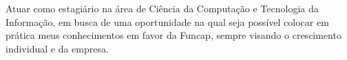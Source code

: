 


\begin{cvparagraph}
Atuar como estagiário na área de Ciência da Computação e Tecnologia da Informação, em busca de uma oportunidade na qual seja possível colocar em prática meus conhecimentos em favor da Funcap, sempre visando o crescimento individual e da empresa.
\end{cvparagraph}



